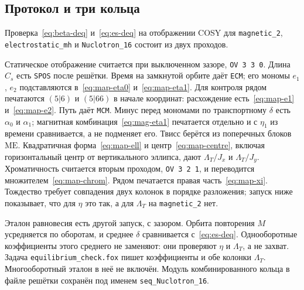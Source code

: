 \subsection{Протокол и три кольца}
\label{sec:map-rings}

Проверка~\eqref{eq:beta-deq} и~\eqref{eq:es-deq} на отображении COSY для \texttt{magnetic\_2}, \texttt{electrostatic\_mh} и \texttt{Nuclotron\_16} состоит из двух проходов.

Статическое отображение считается при выключенном зазоре, \texttt{OV 3 3 0}. Длина $C_s$ есть \texttt{SPOS} после решётки. Время на замкнутой орбите даёт \texttt{ECM}; его мономы $e_1$, $e_2$ подставляются в~\eqref{eq:map-eta0} и~\eqref{eq:map-eta1}. Для контроля рядом печатаются $(5|6)$ и $(5|66)$ в начале координат: расхождение есть~\eqref{eq:map-e1} и~\eqref{eq:map-e2}. Путь даёт \texttt{MCM}. Минус перед мономами по транспортному $\delta$ есть $\alpha_0$ и $\alpha_1$; магнитная комбинация~\eqref{eq:mag-eta1} печатается отдельно и с $\eta_1$ из времени сравнивается, а не подменяет его. Твисс берётся из поперечных блоков $\mathrm{ME}$. Квадратичная форма~\eqref{eq:map-ell} и центр~\eqref{eq:map-centre}, включая горизонтальный центр от вертикального эллипса, дают $\Lambda_T/J_x$ и $\Lambda_T/J_y$. Хроматичность считается вторым проходом, \texttt{OV 3 2 1}, и переводится множителем~\eqref{eq:map-chrom}. Рядом печатается правая часть~\eqref{eq:map-xi}. Тождество требует совпадения двух колонок в порядке разложения; запуск ниже показывает, что для $\eta$ это так, а для $\Lambda_T$ на \texttt{magnetic\_2} нет.

Эталон равновесия есть другой запуск, с зазором. Орбита повторения $M$ усредняется по оборотам, и среднее $\delta$ сравнивается с~\eqref{eq:es-deq}. Однооборотные коэффициенты этого среднего не заменяют: они проверяют $\eta$ и $\Lambda_T$, а не захват. Задача \texttt{equilibrium\_check.fox} пишет коэффициенты и обе колонки $\Lambda_T$. Многооборотный эталон в неё не включён. Модуль комбинированного кольца в файле решётки сохранён под именем \texttt{seq\_Nuclotron\_16}.

